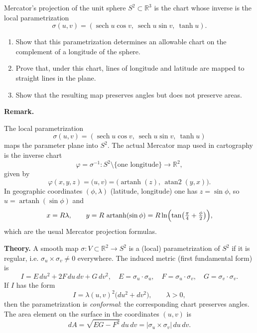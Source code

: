 \begin{problem}
\label{prob:cp-vii-0046}
Mercator's projection of the unit sphere $S^{2}\subset\mathbb{R}^{3}$ is the
chart whose inverse is the local parametrization
\[
\sigma(u,v) = (\operatorname{sech}u\cos v,\ \operatorname{sech}u\sin v,\ \tanh u).
\]
\begin{enumerate}
	\item Show that this parametrization determines an allowable chart on
	the complement of a longitude of the sphere.
	\item Prove that, under this chart, lines of longitude and latitude are
	mapped to straight lines in the plane.
	\item Show that the resulting map preserves angles but does not preserve areas.
\end{enumerate}

\medskip
\textbf{Remark.}

The local parametrization
\[
\sigma(u,v) = (\operatorname{sech}u\cos v,\ \operatorname{sech}u\sin v,\ \tanh u)
\]
maps the parameter plane into $S^2$. The actual Mercator map used in
cartography is the inverse chart
\[
\varphi = \sigma^{-1}: S^2\setminus\{\text{one longitude}\}\to\mathbb{R}^2,
\]
given by
\[
\varphi(x,y,z) = \bigl(u,v\bigr)
= \bigl(\operatorname{artanh}(z),\,\operatorname{atan2}(y,x)\bigr).
\]
In geographic coordinates $(\phi,\lambda)$ (latitude, longitude) one has
$z=\sin\phi$, so $u=\operatorname{artanh}(\sin\phi)$ and
\[
x = R\lambda,\qquad y = R\,\operatorname{artanh}(\sin\phi)
= R\ln\Bigl(\tan\bigl(\tfrac{\pi}{4}+\tfrac{\phi}{2}\bigr)\Bigr),
\]
which are the usual Mercator projection formulas.


\medskip
\textbf{Theory.}
A smooth map $\sigma:V\subset\mathbb{R}^{2}\to S^{2}$ is a (local)
parametrization of $S^{2}$ if it is regular, i.e.
$\sigma_u\times\sigma_v\neq 0$ everywhere.
The induced metric (first fundamental form) is
\[
I = E\,du^{2} + 2F\,du\,dv + G\,dv^{2},
\quad
E = \sigma_u\cdot\sigma_u,\quad
F = \sigma_u\cdot\sigma_v,\quad
G = \sigma_v\cdot\sigma_v.
\]
If $I$ has the form
\[
I = \lambda(u,v)^{2}\big(du^{2}+dv^{2}\big),\qquad \lambda>0,
\]
then the parametrization is \emph{conformal}: the corresponding chart
preserves angles. The area element on the surface in the coordinates
$(u,v)$ is
\[
dA = \sqrt{EG-F^{2}}\,du\,dv = |\sigma_u\times\sigma_v|\,du\,dv.
\]

\medskip
\end{problem}


